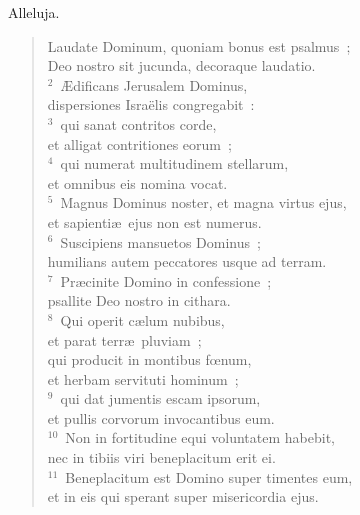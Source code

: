 \bchapter
\lettrine[lines=3,image=true,loversize=0.05,lraise=-0.03]{A}{}lleluja. \begin{flushleft}\begin{verse}\vspace{6pt}Laudate Dominum, quoniam bonus est psalmus~;\\ Deo nostro sit jucunda, decoraque laudatio.\\
${}^{2}$~\AE dificans Jerusalem Dominus,\\ dispersiones Isra\"elis congregabit~:\\
${}^{3}$~qui sanat contritos corde,\\ et alligat contritiones eorum~;\\
${}^{4}$~qui numerat multitudinem stellarum,\\ et omnibus eis nomina vocat.\\
${}^{5}$~Magnus Dominus noster, et magna virtus ejus,\\ et sapienti\ae\ ejus non est numerus.\\
${}^{6}$~Suscipiens mansuetos Dominus~;\\ humilians autem peccatores usque ad terram.\\
${}^{7}$~Pr\ae cinite Domino in confessione~;\\ psallite Deo nostro in cithara.\\
${}^{8}$~Qui operit c\ae lum nubibus,\\ et parat terr\ae\ pluviam~;\\ qui producit in montibus fœnum,\\ et herbam servituti hominum~;\\
${}^{9}$~qui dat jumentis escam ipsorum,\\ et pullis corvorum invocantibus eum.\\
${}^{10}$~Non in fortitudine equi voluntatem habebit,\\ nec in tibiis viri beneplacitum erit ei.\\
${}^{11}$~Beneplacitum est Domino super timentes eum,\\ et in eis qui sperant super misericordia ejus.\end{verse}\end{flushleft}



